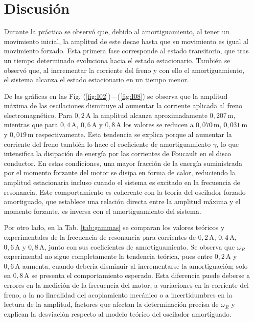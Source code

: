 \section*{Discusi\'on}

Durante la pr\'actica se observ\'o que, debido al amortiguamiento, al tener un 
movimiento inicial, la amplitud de este decae hasta que su movimiento es igual 
al movimiento forzado. Esta primera fase corresponde al estado transitorio, que 
tras un tiempo determinado evoluciona hacia el estado estacionario. Tambi\'en se 
observ\'o que, al incrementar la corriente del freno y con ello el 
amortiguamiento, el sistema alcanza el estado estacionario en un tiempo menor.

De las gr\'aficas en las Fig. (\ref{fig:I02})---(\ref{fig:I08}) se observa que 
la amplitud m\'axima de las oscilaciones disminuye al aumentar la corriente 
aplicada al freno electromagn\'etico. Para \(0{,}2\,\text{A}\) la amplitud 
alcanza aproximadamente \(0{,}207\,\text{m}\), mientras que para 
\(0{,}4\,\text{A}\), \(0{,}6\,\text{A}\) y \(0{,}8\,\text{A}\) los valores se 
reducen a \(0{,}070\,\text{m}\), \(0{,}031\,\text{m}\) y \(0{,}019\,\text{m}\) 
respectivamente. Esta tendencia se explica porque al aumentar la corriente del 
freno tambi\'en lo hace el coeficiente de amortiguamiento \(\gamma\), lo que 
intensifica la disipaci\'on de energ\'ia por las corrientes de Foucault en el 
disco conductor. En estas condiciones, una mayor fracci\'on de la energ\'ia 
suministrada por el momento forzante del motor se disipa en forma de calor, 
reduciendo la amplitud estacionaria incluso cuando el sistema es excitado en la 
frecuencia de resonancia. Este comportamiento es coherente con la teor\'ia del 
oscilador forzado amortiguado, que establece una relaci\'on directa entre la 
amplitud m\'axima y el momento forzante, es inversa con el amortiguamiento del 
sistema.

Por otro lado, en la Tab. \ref{tab:gammas} se comparan los valores te\'oricos y 
experimentales de la frecuencia de resonancia para corrientes de \(0{,}2\,\text{A}\), 
\(0{,}4\,\text{A}\), \(0{,}6\,\text{A}\) y \(0{,}8\,\text{A}\), junto con sus 
coeficientes de amortiguamiento. Se observa que \(\omega_R\) experimental no 
sigue completamente la tendencia te\'orica, pues entre \(0{,}2\,\text{A}\) y 
\(0{,}6\,\text{A}\) aumenta, cuando deber\'ia disminuir al incrementarse la 
amortiguaci\'on; solo en \(0{,}8\,\text{A}\) se presenta el comportamiento 
esperado. Esta diferencia puede deberse a errores en la medici\'on de la 
frecuencia del motor, a variaciones en la corriente del freno, a la no 
linealidad del acoplamiento mec\'anico o a incertidumbres en la lectura de la 
amplitud, factores que afectan la determinaci\'on precisa de \(\omega_R\) y 
explican la desviaci\'on respecto al modelo te\'orico del oscilador amortiguado.

